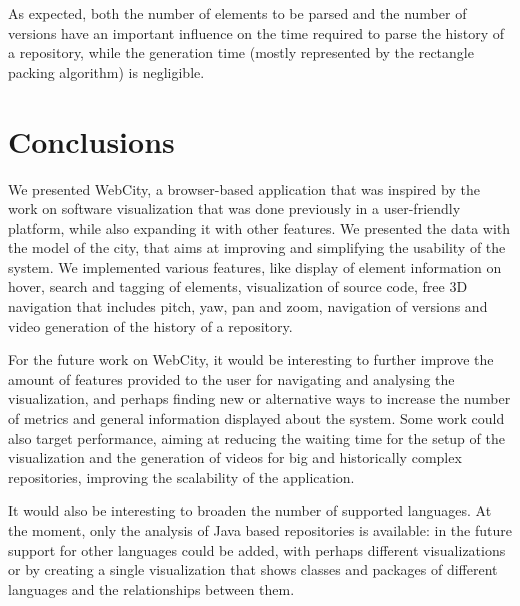 \documentclass[]{usiinfbachelorproject}
\begin{document}
As expected, both the number of elements to be parsed and the number of versions have an important influence on the time required to parse the history of a repository, while the generation time (mostly represented by the rectangle packing algorithm) is negligible.


\section{Conclusions} \label{Conclusions and future work}
We presented WebCity, a browser-based application that was inspired by the work on software visualization that was done previously \cite{Wett07b} \cite{Wett2008b} \cite{Wett2008a} in a user-friendly platform, while also expanding it with other features.
We presented the data with the model of the city, that aims at improving and simplifying the usability of the system.
We implemented various features, like display of element information on hover, search and tagging of elements, visualization of source code, free 3D navigation that includes pitch, yaw, pan and zoom, navigation of versions and video generation of the history of a repository.

For the future work on WebCity, it would be interesting to further improve the amount of features provided to the user for navigating and analysing the visualization, and perhaps finding new or alternative ways to increase the number of metrics and general information displayed about the system.
Some work could also target performance, aiming at reducing the waiting time for the setup of the visualization and the generation of videos for big and historically complex repositories, improving the scalability of the application.

It would also be interesting to broaden the number of supported languages. At the moment, only the analysis of Java based repositories is available: in the future support for other languages could be added, with perhaps different visualizations or by creating a single visualization that shows classes and packages of different languages and the relationships between them.
\end{document}
